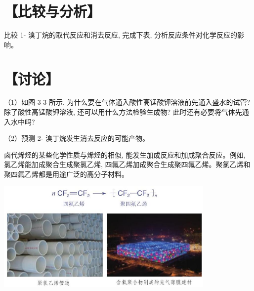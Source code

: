 \documentclass[10pt]{article}
\begin{document}
\section*{【比较与分析】}

比较 1- 溴丁烷的取代反应和消去反应, 完成下表, 分析反应条件对化学反应的影响。

\begin{center}
\end{center}

\section*{【讨论】}

（1）如图 3-3 所示, 为什么要在气体通入酸性高锰酸钾溶液前先通入盛水的试管? 除了酸性高锰酸钾溶液, 还可以用什么方法检验生成物? 此时还有必要将气体先通入水中吗?

（2）预测 2- 溴丁烷发生消去反应的可能产物。

卤代烯烃的某些化学性质与烯烃的相似, 能发生加成反应和加成聚合反应。例如, 氯乙烯能加成聚合生成聚氯乙烯, 四氟乙烯加成聚合生成聚四氟乙烯。聚氯乙烯和聚四氟乙烯都是用途广泛的高分子材料。

\begin{center}
\includegraphics[max width=0.8\textwidth]{images/0190efc5-b58a-7c43-bfb0-e0a030df9cfd_62_889614.jpg}
\end{center}
\end{document}
